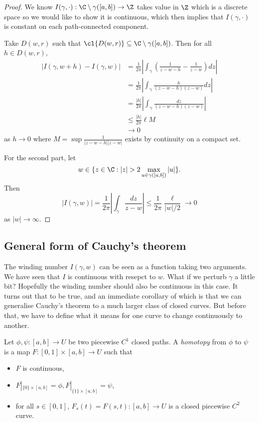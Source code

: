 \documentclass[a4paper]{article}
\begin{document}
\begin{proof}
  We know \(I(\gamma, \cdot): \C \setminus \gamma([a, b]) \to \Z\) takes value in \(\Z\) which is a discrete space so we would like to show it is continuous, which then implies that \(I(\gamma, \cdot)\) is constant on each path-connected component.

  Take \(D(w, r)\) such that \(\cl{D(w, r)} \subseteq \C \setminus \gamma([a, b])\). Then for all \(h \in D(w, r)\),
  \begin{align*}
    |I(\gamma, w + h) - I(\gamma, w)|
    &= \frac{1}{2\pi} \left| \int_\gamma\left( \frac{1}{z - w- h} - \frac{1}{z - w} \right) dz \right| \\
    &= \frac{1}{2\pi} \left| \int_\gamma \frac{h}{(z - w - h)(z - w)} dz \right| \\
    &= \frac{|h|}{2\pi} \left| \int_\gamma \frac{dz}{(z - w - h)(z - w)} \right| \\
    &\leq \frac{|h|}{2\pi} \ell M \\
    &\to 0
  \end{align*}
  as \(h \to 0\) where \(M = \sup \frac{1}{|z - w - h||z - w|}\) exists by continuity on a compact set.

  For the second part, let
  \[
    w \in \{z \in \C: |z| > 2 \max_{u \in \gamma([a, b])} |u|\}.
  \]
  Then
  \[
    |I(\gamma, w)|
    = \frac{1}{2\pi} \left| \int_\gamma \frac{dz}{z - w} \right|
    \leq \frac{1}{2\pi} \frac{\ell}{|w|/2} \to 0
  \]
  as \(|w| \to \infty\).
\end{proof}

\subsection{General form of Cauchy's theorem}

The winding number \(I(\gamma, w)\) can be seen as a function taking two arguments. We have seen that \(I\) is continuous with resepct to \(w\). What if we perturb \(\gamma\) a little bit? Hopefully the winding number should also be continuous in this case. It turns out that to be true, and an immediate corollary of which is that we can generalise Cauchy's theorem to a much larger class of closed curves. But before that, we have to define what it means for one curve to change continuously to another. 

\begin{definition}[Homotopy]
  Let \(\phi, \psi: [a, b] \to U\) be two piecewise \(C^1\) closed paths. A \emph{homotopy} from \(\phi\) to \(\psi\) is a map \(F: [0, 1] \times [a, b] \to U\) such that
  \begin{itemize}
  \item \(F\) is continuous,
  \item \(F|_{\{0\} \times [a, b]} = \phi, F|_{\{1\} \times [a, b]} = \psi\),
  \item for all \(s \in [0, 1]\), \(F_s(t) = F(s, t): [a, b] \to U\) is a closed piecewise \(C^2\) curve.
  \end{itemize}
\end{definition}
\end{document}
